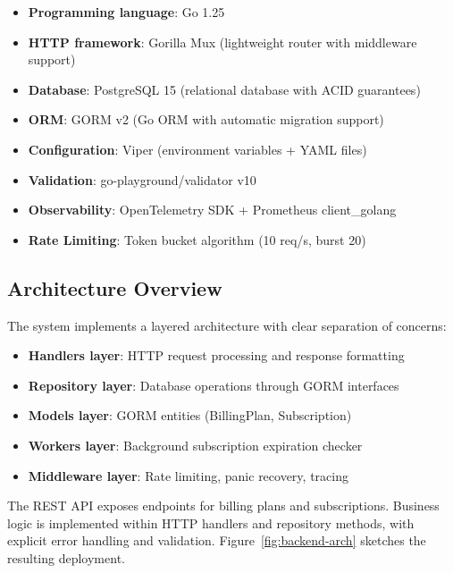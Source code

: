 \begin{itemize}
    \item \textbf{Programming language}: Go 1.25
    \item \textbf{HTTP framework}: Gorilla Mux (lightweight router with middleware support)
    \item \textbf{Database}: PostgreSQL 15 (relational database with ACID guarantees)
    \item \textbf{ORM}: GORM v2 (Go ORM with automatic migration support)
    \item \textbf{Configuration}: Viper (environment variables + YAML files)
    \item \textbf{Validation}: go-playground/validator v10
    \item \textbf{Observability}: OpenTelemetry SDK + Prometheus client\_golang
    \item \textbf{Rate Limiting}: Token bucket algorithm (10 req/s, burst 20)
\end{itemize}

\subsection{Architecture Overview}

The system implements a layered architecture with clear separation of concerns:

\begin{itemize}
    \item \textbf{Handlers layer}: HTTP request processing and response formatting
    \item \textbf{Repository layer}: Database operations through GORM interfaces
    \item \textbf{Models layer}: GORM entities (BillingPlan, Subscription)
    \item \textbf{Workers layer}: Background subscription expiration checker
    \item \textbf{Middleware layer}: Rate limiting, panic recovery, tracing
\end{itemize}

The REST API exposes endpoints for billing plans and subscriptions. Business logic is implemented within HTTP handlers and repository methods, with explicit error handling and validation. Figure~\ref{fig:backend-arch} sketches the resulting deployment.

